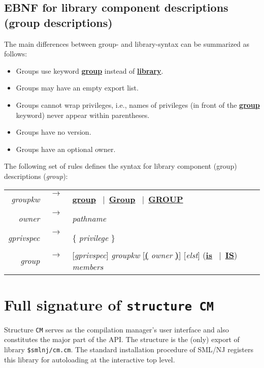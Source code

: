 \documentclass[titlepage,letterpaper]{article}
\newcommand{\nt}[1]{{\it #1}}
\newcommand{\tl}[1]{{\underline{\bf #1}}}
\newcommand{\ar}{$\rightarrow$\ }
\newcommand{\vb}{~$|$~}
\begin{document}
\subsection{EBNF for library component descriptions (group descriptions)}

The main differences between group- and library-syntax can be
summarized as follows:

\begin{itemize}\setlength{\itemsep}{0pt}
\item Groups use keyword \tl{group} instead of \tl{library}.
\item Groups may have an empty export list.
\item Groups cannot wrap privileges, i.e., names of privileges (in
front of the \tl{group} keyword) never appear within parentheses.
\item Groups have no version.
\item Groups have an optional owner.
\end{itemize}

\noindent The following set of rules defines the syntax for library
component (group) descriptions (\nt{group}):

\begin{tabular}{rcl}
\nt{groupkw}   &\ar& \tl{group} \vb \tl{Group} \vb \tl{GROUP} \\
\nt{owner}     &\ar& \nt{pathname} \\
\nt{gprivspec} &\ar& \{ \nt{privilege} \} \\
\nt{group}     &\ar& [\nt{gprivspec}] \nt{groupkw} [\tl{(} \nt{owner} \tl{)}] [\nt{elst}] (\tl{is} \vb \tl{IS}) \nt{members}
\end{tabular}

\section{Full signature of {\tt structure CM}}

Structure {\tt CM} serves as the compilation manager's user interface
and also constitutes the major part of the API.  The structure is the
(only) export of library {\tt \$smlnj/cm.cm}.  The standard
installation procedure of SML/NJ registers this library for
autoloading at the interactive top level.
\end{document}
